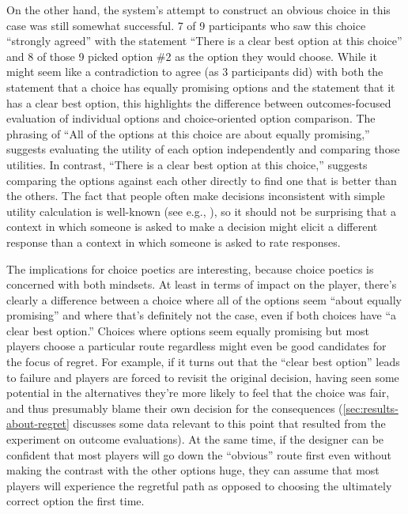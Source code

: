 On the other hand, the system's attempt to construct an obvious choice in this case was still somewhat successful.
%
7 of 9 participants who saw this choice ``strongly agreed'' with the statement ``There is a clear best option at this choice'' and 8 of those 9 picked option \#2 as the option they would choose.
%
While it might seem like a contradiction to agree (as 3 participants did) with both the statement that a choice has equally promising options and the statement that it has a clear best option, this highlights the difference between outcomes-focused evaluation of individual options and choice-oriented option comparison.
%
The phrasing of ``All of the options at this choice are about equally promising,'' suggests evaluating the utility of each option independently and comparing those utilities.
%
In contrast, ``There is a clear best option at this choice,'' suggests comparing the options against each other directly to find one that is better than the others.
%
The fact that people often make decisions inconsistent with simple utility calculation is well-known (see e.g., \citep{Tversky1993}), so it should not be surprising that a context in which someone is asked to make a decision might elicit a different response than a context in which someone is asked to rate responses.


The implications for choice poetics are interesting, because choice poetics is concerned with both mindsets.
%
At least in terms of impact on the player, there's clearly a difference between a choice where all of the options seem ``about equally promising'' and where that's definitely not the case, even if both choices have ``a clear best option.''
%
Choices where options seem equally promising but most players choose a particular route regardless might even be good candidates for the focus of regret.
%
For example, if it turns out that the ``clear best option'' leads to failure and players are forced to revisit the original decision, having seen some potential in the alternatives they're more likely to feel that the choice was fair, and thus presumably blame their own decision for the consequences (\cref{sec:results-about-regret} discusses some data relevant to this point that resulted from the experiment on outcome evaluations).
%
At the same time, if the designer can be confident that most players will go down the ``obvious'' route first even without making the contrast with the other options huge, they can assume that most players will experience the regretful path as opposed to choosing the ultimately correct option the first time.


